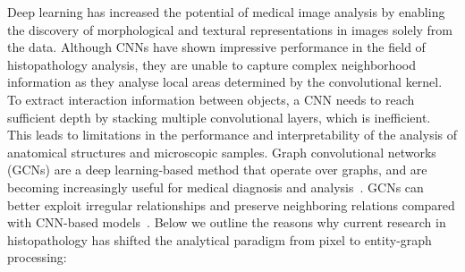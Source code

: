 Deep learning has increased the potential of medical image analysis by enabling the discovery of morphological and textural representations in images solely from the data. Although CNNs have shown impressive performance in the field of histopathology analysis, they are unable to capture complex neighborhood information as they analyse local areas determined by the convolutional kernel. To extract interaction information between objects, a CNN needs to reach sufficient depth by stacking multiple convolutional layers, which is inefficient. This leads to limitations in the performance and interpretability of the analysis of anatomical structures and microscopic samples.
Graph convolutional networks (GCNs) are a deep learning-based method that operate over graphs, and are becoming increasingly useful for medical diagnosis and analysis~. GCNs can better exploit irregular relationships and preserve neighboring relations compared with CNN-based models~. 
Below we outline the reasons why current research in histopathology has shifted the analytical paradigm from pixel to entity-graph processing:
